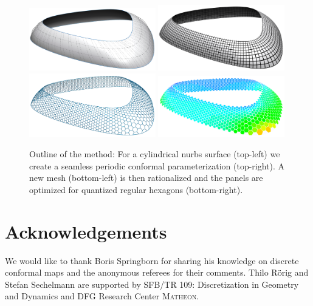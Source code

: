 \documentclass[twoside]{article}
\newcommand{\nurbs}{{\sc nurbs}\xspace}
\def\mainbibliography {
	
}
\begin{document}
\begin{figure}[h!]
  \centering
  \includegraphics[width=0.49\textwidth]{images/teaser1_grid.png}
  \includegraphics[width=0.49\textwidth]{images/teaser2_2.png}
  \includegraphics[width=0.49\textwidth]{images/teaser4_1.png}
  \includegraphics[width=0.49\textwidth]{images/quantized_aligned5.png}
  \caption{Outline of the method: For a cylindrical \nurbs
  surface (top-left) we create a seamless periodic conformal parameterization (top-right). A new
    mesh (bottom-left) is then rationalized and the panels are
    optimized for quantized regular hexagons (bottom-right).}
  \label{fig:teaser}
\end{figure}










\section*{Acknowledgements}
We would like to thank Boris Springborn for sharing his knowledge on
discrete conformal maps and the anonymous referees for their comments.
Thilo R\"orig and Stefan Sechelmann are supported by SFB/TR 109:
Discretization in Geometry and Dynamics and DFG Research Center
\textsc{Matheon}.


\mainbibliography
\end{document}
